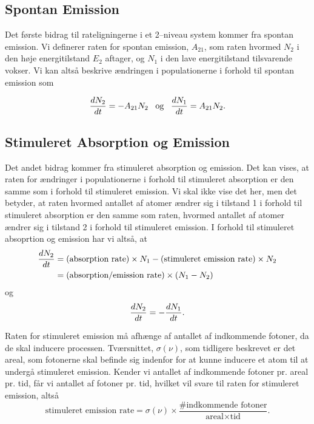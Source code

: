 \subsection{Spontan Emission}
Det første bidrag til rateligningerne i et 2--niveau system kommer fra spontan emission. Vi definerer raten for spontan emission, $A_{21}$, som raten hvormed $N_2$ i den høje energitilstand $E_2$ aftager, og $N_1$ i den lave energitilstand tilsvarende vokser. Vi kan altså beskrive ændringen i populationerne i forhold til spontan emission som 

\begin{equation}
{d{N_2} \over d{t}} = -A_{21}N_2 \,\,\,\,\, \text{og} \,\,\,\,\, {d{N_1} \over d{t}} = A_{21}N_2.
\label{eq:spontane}
\end{equation}

\subsection{Stimuleret Absorption og Emission}
Det andet bidrag kommer fra stimuleret absorption og emission. Det kan vises, at raten for ændringer i populationerne i forhold til stimuleret absorption er den samme som i forhold til stimuleret emission. Vi skal ikke vise det her, men det betyder, at raten hvormed antallet af atomer ændrer sig i tilstand 1 i forhold til stimuleret absorption er den samme som raten, hvormed antallet af atomer ændrer sig i tilstand 2 i forhold til stimuleret emission. I forhold til stimuleret absoprtion og emission har vi altså, at
\begin{align}
{d{N_2} \over d{t}} &= \text{(absorption rate)} \times N_1 - \text{(stimuleret emission rate)} \times N_2\\ &= \text{(absorption/emission rate)} \times (N_1-N_2)
\label{eq:stim1}
\end{align}
og 
\begin{equation}
{d{N_2} \over d{t}} = -{d{N_1} \over d{t}}. 
\label{eq:stim2}
\end{equation}

Raten for stimuleret emission må afhænge af antallet af indkommende fotoner, da de skal inducere processen. Tværsnittet, $\sigma(\nu)$, som tidligere beskrevet er det areal, som fotonerne skal befinde sig indenfor for at kunne inducere et atom til at undergå stimuleret emission. Kender vi antallet af indkommende fotoner pr. areal pr. tid, får vi antallet af fotoner pr. tid, hvilket vil svare til raten for stimuleret emission, altså
\begin{equation}
\text{stimuleret emission rate} = \sigma(\nu) \times \frac{\text{\# indkommende fotoner}}{\text{areal} \times \text{tid}}.
\end{equation}

